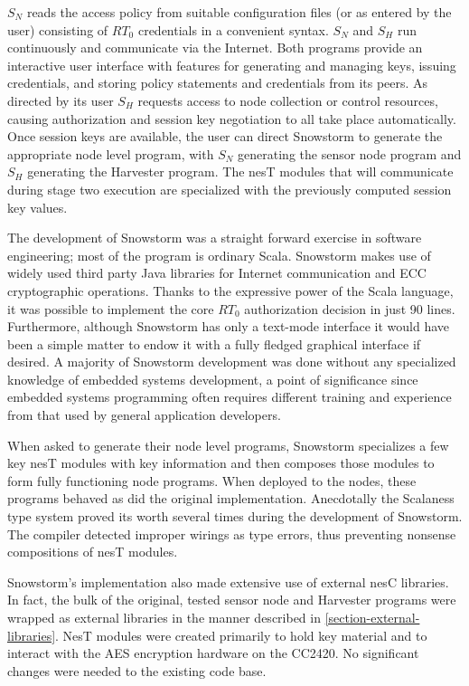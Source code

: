 $S_N$ reads the access policy from suitable configuration files (or as entered by the user)
consisting of $RT_0$ credentials in a convenient syntax. $S_N$ and $S_H$ run continuously and
communicate via the Internet. Both programs provide an interactive user interface with features
for generating and managing keys, issuing credentials, and storing policy statements and
credentials from its peers. As directed by its user $S_H$ requests access to node collection or
control resources, causing authorization and session key negotiation to all take place
automatically. Once session keys are available, the user can direct Snowstorm to generate the
appropriate node level program, with $S_N$ generating the sensor node program and $S_H$
generating the Harvester program. The nesT modules that will communicate during stage two
execution are specialized with the previously computed session key values.

The development of Snowstorm was a straight forward exercise in software engineering; most of
the program is ordinary Scala. Snowstorm makes use of widely used third party Java libraries for
Internet communication and ECC cryptographic operations. Thanks to the expressive power of the
Scala language, it was possible to implement the core $RT_0$ authorization decision in just 90
lines. Furthermore, although Snowstorm has only a text-mode interface it would have been a
simple matter to endow it with a fully fledged graphical interface if desired. A majority of
Snowstorm development was done without any specialized knowledge of embedded systems
development, a point of significance since embedded systems programming often requires different
training and experience from that used by general application developers.

When asked to generate their node level programs, Snowstorm specializes a few key nesT modules
with key information and then composes those modules to form  fully functioning node programs.
When deployed to the nodes, these programs behaved as did the original implementation.
Anecdotally the Scalaness type system proved its worth several times during the development of
Snowstorm. The compiler detected improper wirings as type errors, thus preventing nonsense
compositions of nesT modules. 

Snowstorm's implementation also made extensive use of external nesC libraries. In fact, the bulk
of the original, tested sensor node and Harvester programs were wrapped as external libraries in
the manner described in \autoref{section-external-libraries}. NesT modules were created
primarily to hold key material and to interact with the AES encryption hardware on the CC2420.
No significant changes were needed to the existing code base.

